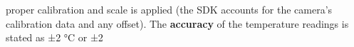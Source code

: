 proper calibration and scale is applied (the SDK accounts for the camera's calibration data and any offset). The \textbf{accuracy} of the temperature readings is stated as ±2 °C or ±2%